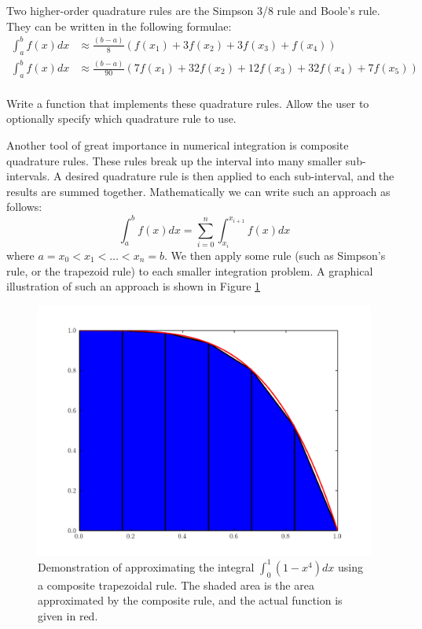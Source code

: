 \begin{problem}
Two higher-order quadrature rules are the Simpson 3/8 rule and Boole's rule.
They can be written in the following formulae:
\begin{align*}
\int_a^b f(x) dx &\approx \frac{(b-a)}{8}\left(f(x_1) + 3 f(x_2) + 3 f(x_3) + f(x_4)\right) \\
\int_a^b f(x) dx &\approx \frac{(b-a)}{90}\left(7f(x_1) + 32 f(x_2) + 12 f(x_3) + 32f(x_4) + 7 f(x_5)\right) \\
\end{align*}

Write a function that implements these quadrature rules.
Allow the user to optionally specify which quadrature rule to use.
\end{problem}

Another tool of great importance in numerical integration is composite quadrature rules.
These rules break up the interval into many smaller sub-intervals.
A desired quadrature rule is then applied to each sub-interval, and the results are summed together.
Mathematically we can write such an approach as follows:
\[
\int_a^b f(x) dx = \sum_{i=0}^n \int_{x_i}^{x_{i+1}} f(x) dx
\]
where $a = x_0 < x_1 < \ldots < x_n = b$.
We then apply some rule (such as Simpson's rule, or the trapezoid rule) to each smaller integration problem.
A graphical illustration of such an approach is shown in Figure \ref{Fig:TrapezoidalComposite}

\begin{figure}
\begin{center}
\includegraphics[width=\textwidth]{TrapezoidComp.pdf}
\caption{Demonstration of approximating the integral $\int_0^1 (1-x^4)dx$ using a composite trapezoidal rule.
The shaded area is the area approximated by the composite rule, and the actual function is given in red.}
\label{Fig:TrapezoidalComposite}
\end{center}
\end{figure}

